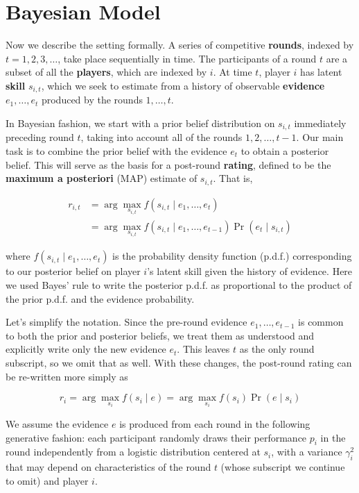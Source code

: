 
\section{Bayesian Model}

Now we describe the setting formally. A series of competitive \textbf{rounds}, indexed by $t=1,2,3,\ldots$, take place sequentially in time. The participants of a round $t$ are a subset of all the \textbf{players}, which are indexed by $i$. At time $t$, player $i$ has latent \textbf{skill} $s_{i,t}$, which we seek to estimate from a history of observable \textbf{evidence} $e_1,\ldots,e_t$ produced by the rounds $1,\ldots,t$.

In Bayesian fashion, we start with a prior belief distribution on $s_{i,t}$ immediately preceding round $t$, taking into account all of the rounds $1,2,\ldots,t-1$. Our main task is to combine the prior belief with the evidence $e_t$ to obtain a posterior belief. This will serve as the basis for a post-round \textbf{rating}, defined to be the \textbf{maximum a posteriori} (MAP) estimate of $s_{i,t}$. That is,

\begin{align*}
r_{i,t} &= \arg\max_{s_{i,t}} f(s_{i,t} \mid e_1,\ldots,e_t) \\
&= \arg\max_{s_{i,t}} f(s_{i,t} \mid e_1,\ldots,e_{t-1}) \Pr(e_t \mid s_{i,t})
\end{align*}

where $f(s_{i,t} \mid e_1,\ldots,e_t)$ is the probability density function (p.d.f.) corresponding to our posterior belief on player $i$'s latent skill given the history of evidence. Here we used Bayes' rule to write the posterior p.d.f. as proportional to the product of the prior p.d.f. and the evidence probability.

Let's simplify the notation. Since the pre-round evidence $e_1,\ldots,e_{t-1}$ is common to both the prior and posterior beliefs, we treat them as understood and explicitly write only the new evidence $e_t$. This leaves $t$ as the only round subscript, so we omit that as well. With these changes, the post-round rating can be re-written more simply as

\[r_i = \arg\max_{s_i} f(s_i \mid e) = \arg\max_{s_i} f(s_i) \Pr(e \mid s_i)\]

We assume the evidence $e$ is produced from each round in the following generative fashion: each participant randomly draws their performance $p_i$ in the round independently from a logistic distribution centered at $s_i$, with a variance $\gamma_i^2$ that may depend on characteristics of the round $t$ (whose subscript we continue to omit) and player $i$.

